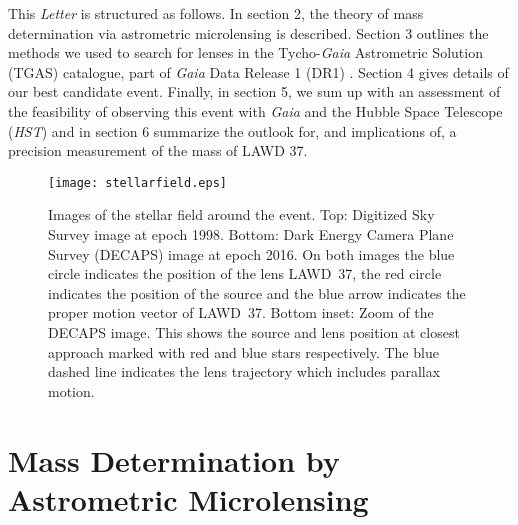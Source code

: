 \documentclass[fleqn,usenatbib]{mnras}
\newcommand{\Gaia}{{\it Gaia }}
\begin{document}
This {\it Letter} is structured as follows. In section 2, the theory of mass determination via astrometric microlensing is described. Section 3 outlines the methods we used to search for lenses in the Tycho-\Gaia Astrometric Solution (TGAS) catalogue, part of \Gaia
Data Release 1 (DR1) \citep{GaiaA,GaiaB,GaiaAstrometry}. Section 4 gives details of our best candidate event. Finally, in section 5, we sum up with an assessment of the feasibility of observing this event with \Gaia and the Hubble Space Telescope ({\it HST}) and in section 6 summarize the outlook for, and implications of, a precision measurement of the mass of LAWD 37.
 
\begin{figure}
\texttt{[image: stellarfield.eps]}
 \caption{Images of the stellar field around the event. Top: Digitized Sky Survey image at epoch 1998. Bottom: Dark Energy Camera Plane Survey (DECAPS) \citep{Decaps2017} image at epoch 2016. On both images the blue circle indicates the position of the lens LAWD~37, the red circle indicates the position of the source and the blue arrow indicates the proper motion vector of LAWD~37. Bottom inset: Zoom of the DECAPS image. This shows the source and lens position at closest approach marked with red and blue stars respectively. The blue dashed line indicates the lens trajectory which includes parallax motion.}
 \label{fig:stellarfield}
\end{figure}

\section{Mass Determination by Astrometric Microlensing}
\end{document}
